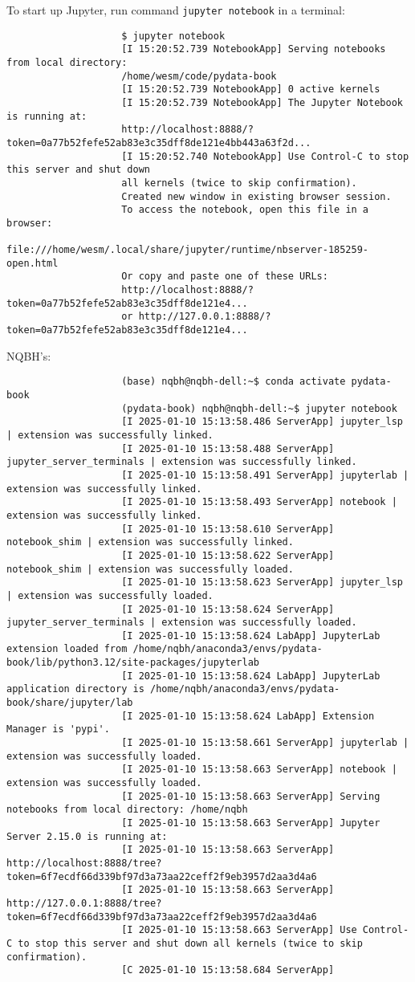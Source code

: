 \documentclass{article}
\begin{document}
\begin{enumerate}
\begin{itemize}
\begin{itemize}
\begin{itemize}
				To start up Jupyter, run command {\tt jupyter notebook} in a terminal:
				\begin{verbatim}
					$ jupyter notebook
					[I 15:20:52.739 NotebookApp] Serving notebooks from local directory:
					/home/wesm/code/pydata-book
					[I 15:20:52.739 NotebookApp] 0 active kernels
					[I 15:20:52.739 NotebookApp] The Jupyter Notebook is running at:
					http://localhost:8888/?token=0a77b52fefe52ab83e3c35dff8de121e4bb443a63f2d...
					[I 15:20:52.740 NotebookApp] Use Control-C to stop this server and shut down
					all kernels (twice to skip confirmation).
					Created new window in existing browser session.
					To access the notebook, open this file in a browser:
					file:///home/wesm/.local/share/jupyter/runtime/nbserver-185259-open.html
					Or copy and paste one of these URLs:
					http://localhost:8888/?token=0a77b52fefe52ab83e3c35dff8de121e4...
					or http://127.0.0.1:8888/?token=0a77b52fefe52ab83e3c35dff8de121e4...
				\end{verbatim}
				NQBH's:
				\begin{verbatim}
					(base) nqbh@nqbh-dell:~$ conda activate pydata-book
					(pydata-book) nqbh@nqbh-dell:~$ jupyter notebook
					[I 2025-01-10 15:13:58.486 ServerApp] jupyter_lsp | extension was successfully linked.
					[I 2025-01-10 15:13:58.488 ServerApp] jupyter_server_terminals | extension was successfully linked.
					[I 2025-01-10 15:13:58.491 ServerApp] jupyterlab | extension was successfully linked.
					[I 2025-01-10 15:13:58.493 ServerApp] notebook | extension was successfully linked.
					[I 2025-01-10 15:13:58.610 ServerApp] notebook_shim | extension was successfully linked.
					[I 2025-01-10 15:13:58.622 ServerApp] notebook_shim | extension was successfully loaded.
					[I 2025-01-10 15:13:58.623 ServerApp] jupyter_lsp | extension was successfully loaded.
					[I 2025-01-10 15:13:58.624 ServerApp] jupyter_server_terminals | extension was successfully loaded.
					[I 2025-01-10 15:13:58.624 LabApp] JupyterLab extension loaded from /home/nqbh/anaconda3/envs/pydata-book/lib/python3.12/site-packages/jupyterlab
					[I 2025-01-10 15:13:58.624 LabApp] JupyterLab application directory is /home/nqbh/anaconda3/envs/pydata-book/share/jupyter/lab
					[I 2025-01-10 15:13:58.624 LabApp] Extension Manager is 'pypi'.
					[I 2025-01-10 15:13:58.661 ServerApp] jupyterlab | extension was successfully loaded.
					[I 2025-01-10 15:13:58.663 ServerApp] notebook | extension was successfully loaded.
					[I 2025-01-10 15:13:58.663 ServerApp] Serving notebooks from local directory: /home/nqbh
					[I 2025-01-10 15:13:58.663 ServerApp] Jupyter Server 2.15.0 is running at:
					[I 2025-01-10 15:13:58.663 ServerApp] http://localhost:8888/tree?token=6f7ecdf66d339bf97d3a73aa22ceff2f9eb3957d2aa3d4a6
					[I 2025-01-10 15:13:58.663 ServerApp]     http://127.0.0.1:8888/tree?token=6f7ecdf66d339bf97d3a73aa22ceff2f9eb3957d2aa3d4a6
					[I 2025-01-10 15:13:58.663 ServerApp] Use Control-C to stop this server and shut down all kernels (twice to skip confirmation).
					[C 2025-01-10 15:13:58.684 ServerApp] 
					

\end{verbatim}
\end{itemize}
\end{itemize}
\end{itemize}
\end{enumerate}
\end{document}

